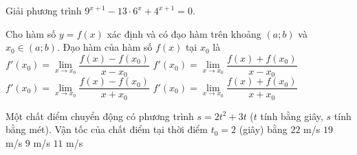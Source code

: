 \begin{bt}%
		Giải phương trình $9^{x+1}-13\cdot 6^x+4^{x+1}=0$.
\end{bt}

\begin{ex}%
	Cho hàm số $y=f(x)$ xác định và có đạo hàm trên khoảng $(a; b)$ và $x_0 \in(a; b)$.  Đạo hàm của hàm số $f(x)$ tại $x_0$ là
	 \choice
		{\True $f'\left(x_0\right)=\lim\limits_{x\to  x_0}\dfrac{f(x)-f\left(x_0\right)}{x-x_0}$}
		{$f'\left(x_0\right)=\lim\limits_{x\to  x_0}\dfrac{f(x)+f\left(x_0\right)}{x-x_0}$}
		 {$f'\left(x_0\right)=\lim\limits_{x\to x_0}\dfrac{f(x)-f\left(x_0\right)}{x+x_0}$}
		{$f'\left(x_0\right)=\lim\limits_{x\to  x_0}\dfrac{f(x)+f\left(x_0\right)}{x+x_0}$}
\end{ex}

\begin{ex}%
	Một chất điểm chuyển động có  phương trình $s=2t^2+3t$ ($t$ tính bằng giây, $s$ tính bằng mét). Vận tốc của chất điểm tại thời điểm $t_0=2$ (giây) bằng
	 \choice
		{$22$  m/s}
		 {$19$ m/s}
		{$9$ m/s} 
		{\True $11$  m/s}
\end{ex}

